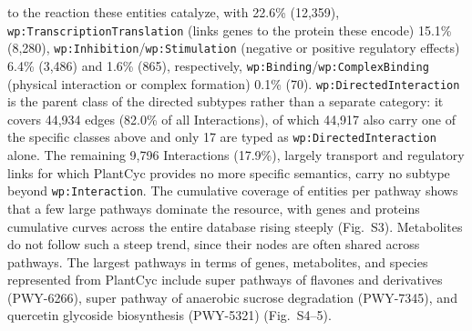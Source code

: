 \documentclass[11pt,a4paper]{article}
\begin{document}
to the reaction these entities catalyze, with 22.6\% (12,359),
\texttt{wp:TranscriptionTranslation} (links genes to the protein these encode) 15.1\% (8,280),
\texttt{wp:Inhibition}/\texttt{wp:Stimulation} (negative or positive regulatory effects) 6.4\%
(3,486) and 1.6\% (865), respectively, \texttt{wp:Binding}/\texttt{wp:ComplexBinding} (physical
interaction or complex formation) 0.1\% (70). \texttt{wp:DirectedInteraction} is the parent class
of the directed subtypes rather than a separate category: it covers 44,934 edges (82.0\% of all
Interactions), of which 44,917 also carry one of the specific classes above and only 17 are typed as
\texttt{wp:DirectedInteraction} alone. The remaining 9,796 Interactions (17.9\%), largely transport
and regulatory links for which PlantCyc provides no more specific semantics, carry no subtype beyond
\texttt{wp:Interaction}. The cumulative coverage of entities
per pathway shows that a few large pathways dominate the resource, with genes and proteins cumulative
curves across the entire database rising steeply (Fig.~S3). Metabolites do not follow such a steep
trend, since their nodes are often shared across pathways. The largest pathways in terms of genes,
metabolites, and species represented from PlantCyc include super pathways of flavones and derivatives
(PWY-6266), super pathway of anaerobic sucrose degradation (PWY-7345), and quercetin glycoside
biosynthesis (PWY-5321) (Fig.~S4--5).
\end{document}
